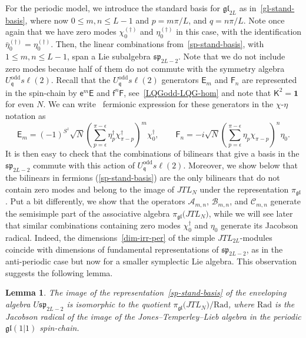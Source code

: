 \documentclass[11pt]{article}
\newcommand{\one}{\boldsymbol{1}}%
\newcommand{\q}{\mathfrak{q}}
\newcommand{\JTL}[1]{JTL_{#1}}
\newcommand{\LQGodd}{U^{\text{odd}}_{\q} s\ell(2)}
\newcommand{\K}{\mathsf{K}}
\newcommand{\F}{\mathsf{F}}
\newcommand{\FF}[1]{\F_{#1}}
\newcommand{\f}{\mathsf{f}}
\newcommand{\E}{\mathsf{E}}
\newcommand{\EE}[1]{\E_{#1}}
\newcommand{\e}{\mathsf{e}}
\newcommand{\chid}{\chi^{\dagger}}
\newcommand{\step}{\epsilon}
\newcommand{\Asp}{\mathcal{A}}
\newcommand{\Bsp}{\mathcal{B}}
\newcommand{\Csp}{\mathcal{C}}
\newcommand{\gl}{\mathfrak{gl}}
\newcommand{\ssp}{\mathfrak{sp}}
\newcommand{\repgl}{\pi_{\gl}}
\newtheorem{lemma}[subsubsection]{Lemma}
\theoremstyle{definition}
\begin{document}
For the periodic model,
we introduce
the standard basis for $\gl_{2L}$ as in~\eqref{gl-stand-basis},
where now $0\leq m,n\leq L-1$ and $p=m\pi/L$, and
$q=n\pi/L$. Note once again that we have zero modes $\chi_0^{(\dagger)}$ and $\eta_0^{(\dagger)}$ in this case, with the identification $\bar{\eta}_0^{(\dagger)}=\eta_0^{(\dagger)}$. Then, the linear combinations
from~\eqref{sp-stand-basis}, with $1\leq m,n\leq L-1$, span a Lie
subalgebra $\ssp_{2L-2}$. Note that we do not include zero modes because half of them do not commute with the symmetry algebra $\LQGodd$.
 Recall that the $\LQGodd$ generators $\EE m$ and $\FF n$ are represented
in the spin-chain by $\e^m\E$ and $\f^n\F$, see~\eqref{LQGodd-LQG-hom} and note that
$\K^2=\one$ for even $N$. We  can write~\cite{GRS1} fermionic expression
for these generators in the $\chi$-$\eta$ notation as
\begin{equation}\label{eq:EE-chi-eta}
\EE m = (-1)^{S^z}\sqrt{N}\left(\sum_{p=\step}^{\pi-\step}
\eta^{\dagger}_p\chi^{\dagger}_{\pi-p}\right)^m\chid_0,\qquad
\FF n = -i \sqrt{N}\left(\sum_{p=\step}^{\pi-\step}
\eta_p\chi_{\pi-p}\right)^n\eta_0.
\end{equation}
It is then easy to check that the combinations of bilinears that give a basis in the $\ssp_{2L-2}$ commute with this action of $\LQGodd$.
Moreover, we  show
below that the bilinears in fermions (\ref{sp-stand-basis}) are the only bilinears that
do not contain zero modes and belong to the image of $\JTL{N}$ under
the representation $\repgl$. Put a bit differently, we show that the operators
$\Asp_{m,n}$, $\Bsp_{m,n}$, and $\Csp_{m,n}$ generate the semisimple
part of the associative algebra $\repgl\bigl(\JTL{N}\bigr)$, while we will see later that similar combinations
containing zero modes $\chid_0$ and $\eta_0$ generate its Jacobson
radical.  Indeed, the dimensions~\eqref{dim-irr-per} of the simple $\JTL{2L}$-modules coincide  with dimensions of fundamental representations  of $\ssp_{2L-2}$, as in the anti-periodic case but now for a smaller symplectic Lie algebra. This observation suggests the following lemma.
\newcommand{\rad}{\mathrm{Rad}}
\begin{lemma}\label{lem:ssJTL-sp}
The image of the representation~\eqref{sp-stand-basis} of the enveloping algebra $U \ssp_{2L-2}$ is isomorphic to the quotient $\repgl\bigl(\JTL{N}\bigr)/\rad$, where $\rad$ is the Jacobson radical of the image of the Jones--Temperley--Lieb algebra in the periodic $\gl(1|1)$ spin-chain.
\end{lemma}
\end{document}
